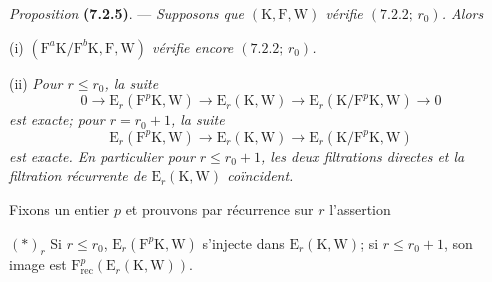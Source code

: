 \documentclass[11pt,leqno]{article}
\begin{document}
\textit{Proposition} \textbf{(7.2.5)}. — \textit{Supposons que \((\mathrm{K},\mathrm{F},\mathrm{W})\) vérifie \((7.2.2;\,r_0)\). Alors}

\noindent
(i) \textit{\((\mathrm{F}^a\mathrm{K}/\mathrm{F}^b\mathrm{K},\mathrm{F},\mathrm{W})\) vérifie encore \((7.2.2;\,r_0)\).}

\noindent
(ii) \textit{Pour \(r\leq r_0\), la suite}
\[
0\to\mathrm{E}_r(\mathrm{F}^p\mathrm{K},\mathrm{W})
\to\mathrm{E}_r(\mathrm{K},\mathrm{W})
\to\mathrm{E}_r(\mathrm{K}/\mathrm{F}^p\mathrm{K},\mathrm{W})\to 0
\]
\textit{est exacte; pour \(r=r_0+1\), la suite}
\[
\mathrm{E}_r(\mathrm{F}^p\mathrm{K},\mathrm{W})
\to\mathrm{E}_r(\mathrm{K},\mathrm{W})
\to\mathrm{E}_r(\mathrm{K}/\mathrm{F}^p\mathrm{K},\mathrm{W})
\]
\textit{est exacte. En particulier pour \(r\leq r_0+1\), les deux filtrations directes et la filtration récurrente de \(\mathrm{E}_r(\mathrm{K},\mathrm{W})\) coïncident.}

Fixons un entier \(p\) et prouvons par récurrence sur \(r\) l’assertion

\((\ast)_r\) Si \(r\leq r_0\), \(\mathrm{E}_r(\mathrm{F}^p\mathrm{K},\mathrm{W})\) s’injecte dans \(\mathrm{E}_r(\mathrm{K},\mathrm{W})\); si \(r\leq r_0+1\), son image est \(\mathrm{F}_{\mathrm{rec}}^p(\mathrm{E}_r(\mathrm{K},\mathrm{W}))\).
\end{document}
